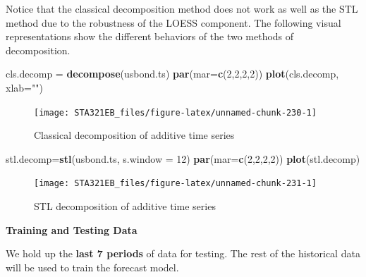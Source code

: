 \documentclass[
]{book}
\newenvironment{Shaded}{\begin{snugshade}}{\end{snugshade}}
\newcommand{\AttributeTok}[1]{\textcolor[rgb]{0.13,0.29,0.53}{#1}}
\newcommand{\DecValTok}[1]{\textcolor[rgb]{0.00,0.00,0.81}{#1}}
\newcommand{\FunctionTok}[1]{\textcolor[rgb]{0.13,0.29,0.53}{\textbf{#1}}}
\newcommand{\NormalTok}[1]{#1}
\newcommand{\OtherTok}[1]{\textcolor[rgb]{0.56,0.35,0.01}{#1}}
\newcommand{\StringTok}[1]{\textcolor[rgb]{0.31,0.60,0.02}{#1}}
\begin{document}
Notice that the classical decomposition method does not work as well as the STL method due to the robustness of the LOESS component. The following visual representations show the different behaviors of the two methods of decomposition.

\begin{Shaded}
\begin{Highlighting}[]
\NormalTok{cls.decomp }\OtherTok{=} \FunctionTok{decompose}\NormalTok{(usbond.ts)}
\FunctionTok{par}\NormalTok{(}\AttributeTok{mar=}\FunctionTok{c}\NormalTok{(}\DecValTok{2}\NormalTok{,}\DecValTok{2}\NormalTok{,}\DecValTok{2}\NormalTok{,}\DecValTok{2}\NormalTok{))}
\FunctionTok{plot}\NormalTok{(cls.decomp, }\AttributeTok{xlab=}\StringTok{""}\NormalTok{)}
\end{Highlighting}
\end{Shaded}

\begin{figure}

{\centering \texttt{[image: STA321EB\_files/figure-latex/unnamed-chunk-230-1]} 

}

\caption{Classical decomposition of additive time series}\label{fig:unnamed-chunk-230}
\end{figure}

\begin{Shaded}
\begin{Highlighting}[]
\NormalTok{stl.decomp}\OtherTok{=}\FunctionTok{stl}\NormalTok{(usbond.ts, }\AttributeTok{s.window =} \DecValTok{12}\NormalTok{)}
\FunctionTok{par}\NormalTok{(}\AttributeTok{mar=}\FunctionTok{c}\NormalTok{(}\DecValTok{2}\NormalTok{,}\DecValTok{2}\NormalTok{,}\DecValTok{2}\NormalTok{,}\DecValTok{2}\NormalTok{))}
\FunctionTok{plot}\NormalTok{(stl.decomp)}
\end{Highlighting}
\end{Shaded}

\begin{figure}

{\centering \texttt{[image: STA321EB\_files/figure-latex/unnamed-chunk-231-1]} 

}

\caption{STL decomposition of additive time series}\label{fig:unnamed-chunk-231}
\end{figure}

\textbf{Training and Testing Data}

We hold up the \textbf{last 7 periods} of data for testing. The rest of the historical data will be used to train the forecast model.
\end{document}
